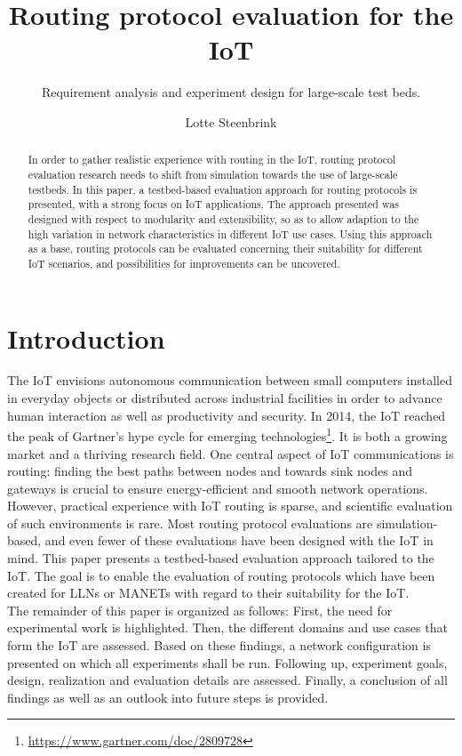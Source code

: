 \documentclass{acm_proc_article-sp}
\begin{document}
\title{Routing protocol evaluation for the IoT}
\subtitle{Requirement analysis and experiment design for large-scale test beds.}

\author{
\alignauthor
Lotte Steenbrink
}

\maketitle
\begin{abstract}
In order to gather realistic experience with routing in the IoT, routing protocol evaluation research needs to shift from simulation towards the use of large-scale testbeds.
In this paper, a testbed-based evaluation approach for routing protocols is presented, with a strong focus on IoT applications. The approach presented was designed with respect to modularity and extensibility, so as to allow adaption to the high variation in network characteristics in different IoT use cases. Using this approach as a base, routing protocols can be evaluated concerning their suitability for different IoT scenarios, and possibilities for improvements can be uncovered.
\end{abstract}


\section{Introduction}
\label{sec:Intro}
The \gls{IoT} envisions autonomous communication between small computers installed in everyday objects or distributed across industrial facilities in order to advance human interaction as well as productivity and security.
In 2014, the \gls{IoT} reached the peak of Gartner's hype cycle for emerging technologies\footnote{ \url{https://www.gartner.com/doc/2809728}}. It is both a growing market and a thriving research field. One central aspect of IoT communications is routing: finding the best paths between nodes and towards sink nodes and gateways is crucial to ensure energy-efficient and smooth network operations. However, practical experience with IoT routing is sparse, and scientific evaluation of such environments is rare. Most routing protocol evaluations are simulation-based, and even fewer of these evaluations have been designed with the IoT in mind.
This paper presents a testbed-based evaluation approach tailored to the IoT. The goal is to enable the evaluation of routing protocols which have been created for \glspl{LLN} or \glspl{MANET} with regard to their suitability for the IoT.\\
The remainder of this paper is organized as follows:
First, the need for experimental work is highlighted. Then, the different domains and use cases that form the IoT are assessed. Based on these findings, a network configuration is presented on which all experiments shall be run. Following up, experiment goals, design, realization and evaluation details are assessed. Finally, a conclusion of all findings as well as an outlook into future steps is provided.
\end{document}
